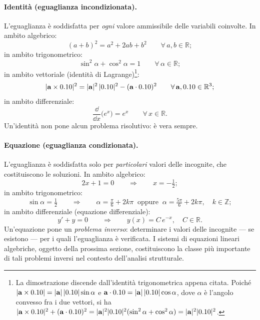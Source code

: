 \paragraph{Identit\`a (eguaglianza incondizionata).}
L'eguaglianza \`e soddisfatta per \textit{ogni} valore ammissibile delle variabili coinvolte. In ambito algebrico:
\begin{equation}
	(a+b)^2 = a^2 + 2ab + b^2 \qquad \forall\, a,b \in \mathbb{R};
\end{equation}
in ambito trigonometrico:
\begin{equation}
	\sin^2\alpha + \cos^2\alpha = 1 \qquad \forall\, \alpha \in \mathbb{R};
\end{equation}
in ambito vettoriale (identit\`a di Lagrange)\footnote{La
	dimostrazione discende dall'identit\`a trigonometrica appena
	citata. Poich\'e $|\mathbf{a}\times0.10| = |\mathbf{a}|\,|0.10|\sin\alpha$
	e $\mathbf{a}\cdot0.10 = |\mathbf{a}|\,|0.10|\cos\alpha$, dove $\alpha$
	\`e l'angolo convesso fra i due vettori, si ha
	$|\mathbf{a}\times0.10|^2 + (\mathbf{a}\cdot0.10)^2
	= |\mathbf{a}|^2|0.10|^2(\sin^2\alpha + \cos^2\alpha)
	= |\mathbf{a}|^2|0.10|^2$.}:
\begin{equation}
	|\mathbf{a}\times0.10|^2
	= |\mathbf{a}|^2\,|0.10|^2 - (\mathbf{a}\cdot0.10)^2
	\qquad \forall\, \mathbf{a},0.10 \in \mathbb{R}^3;
\end{equation}
in ambito differenziale:
\begin{equation}
	\frac{\dd}{\dd x}\bigl(e^x\bigr) = e^x \qquad \forall\, x \in \mathbb{R}.
\end{equation}
Un'identit\`a non pone alcun problema risolutivo: \`e vera sempre.

\paragraph{Equazione (eguaglianza condizionata).}
L'eguaglianza \`e soddisfatta solo per \textit{particolari} valori delle
incognite, che costituiscono le soluzioni. In ambito algebrico:
\begin{equation}
	2x + 1 = 0 \qquad \Longrightarrow \qquad x = -\tfrac{1}{2};
\end{equation}
in ambito trigonometrico:
\begin{equation}
	\sin\alpha = \tfrac{1}{2} \qquad \Longrightarrow \qquad
	\alpha = \tfrac{\pi}{6} + 2k\pi \;\;\text{oppure}\;\;
	\alpha = \tfrac{5\pi}{6} + 2k\pi, \quad k \in \mathbb{Z};
\end{equation}
in ambito differenziale (equazione differenziale):
\begin{equation}
	y' + y = 0 \qquad \Longrightarrow \qquad y(x) = C\, e^{-x},
	\quad C \in \mathbb{R}.
\end{equation}
Un'equazione pone un \textit{problema inverso}: determinare i valori delle
incognite --- se esistono --- per i quali l'eguaglianza \`e verificata. I
sistemi di equazioni lineari algebriche, oggetto della prossima sezione,
costituiscono la classe pi\`u importante di tali problemi inversi nel
contesto dell'analisi strutturale.

